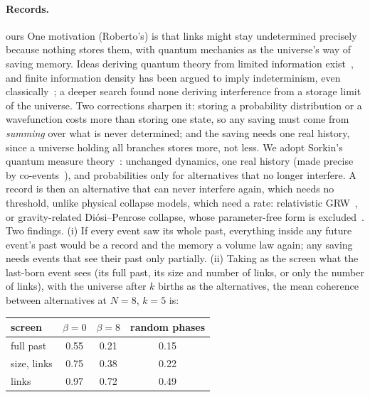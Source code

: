 \documentclass[11pt,a4paper]{article}
\newcommand{\tagbox}[2]{\textsf{\scriptsize\colorbox{#1!12}{\textcolor{#1!70!black}{#2}}}}
\newcommand{\ours}{\tagbox{orange}{ours}}
\begin{document}
\paragraph{Records.} \ours{} One motivation (Roberto's) is that links might stay undetermined precisely because nothing stores them, with quantum mechanics as the universe's way of saving memory. Ideas deriving quantum theory from limited information exist~\cite{Zeilinger99,Spekkens07}, and finite information density has been argued to imply indeterminism, even classically~\cite{DelSantoGisin19}; a deeper search found none deriving interference from a storage limit of the universe. Two corrections sharpen it: storing a probability distribution or a wavefunction costs more than storing one state, so any saving must come from \emph{summing} over what is never determined; and the saving needs one real history, since a universe holding all branches stores more, not less. We adopt Sorkin's quantum measure theory~\cite{Sorkin94}: unchanged dynamics, one real history (made precise by co-events~\cite{Sorkin06co}), and probabilities only for alternatives that no longer interfere. A record is then an alternative that can never interfere again, which needs no threshold, unlike physical collapse models, which need a rate: relativistic GRW~\cite{Tumulka06}, or gravity-related Di\'osi--Penrose collapse, whose parameter-free form is excluded~\cite{Donadi20}. Two findings. (i) If every event saw its whole past, everything inside any future event's past would be a record and the memory a volume law again; any saving needs events that see their past only partially. (ii) Taking as the screen what the last-born event sees (its full past, its size and number of links, or only the number of links), with the universe after $k$ births as the alternatives, the mean coherence between alternatives at $N=8$, $k=5$ is:
\begin{center}\small
\begin{tabular}{@{}lccc@{}}
\toprule
screen & $\beta=0$ & $\beta=8$ & random phases\\
\midrule
full past & 0.55 & 0.21 & 0.15\\
size, links & 0.75 & 0.38 & 0.22\\
links & 0.97 & 0.72 & 0.49\\
\bottomrule
\end{tabular}
\end{center}
\end{document}
